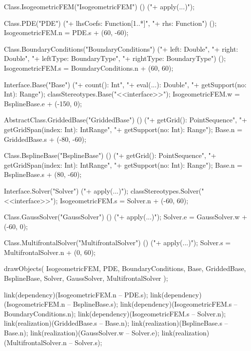  {
	Class.IsogeometricFEM("IsogeometricFEM")
		() ("+ apply(...)");

	Class.PDE("PDE")
		("+ lhsCoefs: Function[1..*]", "+ rhs: Function") ();
	IsogeometricFEM.n = PDE.s + (60, -60);

	Class.BoundaryConditions("BoundaryConditions")
		("+ left: Double", "+ right: Double",
		 "+ leftType: BoundaryType", "+ rightType: BoundaryType") ();
	IsogeometricFEM.s = BoundaryConditions.n + (60, 60);

	Interface.Base("Base")
		("+ count(): Int",
		 "+ eval(...): Double",
		 "+ getSupport(no: Int): Range");
	classStereotypes.Base("<<interface>>");
	IsogeometricFEM.w = BsplineBase.e + (-150, 0);

	AbstractClass.GriddedBase("GriddedBase") ()
		("+ getGrid(): PointSequence",
		 "+ getGridSpan(index: Int): IntRange",
		 "+ getSupport(no: Int): Range");
	Base.n = GriddedBase.s + (-80, -60);

	Class.BsplineBase("BsplineBase") ()
		("+ getGrid(): PointSequence",
		 "+ getGridSpan(index: Int): IntRange",
		 "+ getSupport(no: Int): Range");
	Base.n = BsplineBase.s + (80, -60);

	Interface.Solver("Solver")
		("+ apply(...)");
	classStereotypes.Solver("<<interface>>");
	IsogeometricFEM.s = Solver.n + (-60, 60);

	Class.GaussSolver("GaussSolver")
		() ("+ apply(...)");
	Solver.e = GaussSolver.w + (-60, 0);

	Class.MultifrontalSolver("MultifrontalSolver")
		() ("+ apply(...)");
	Solver.s = MultifrontalSolver.n + (0, 60);


	drawObjects(
		IsogeometricFEM,
		PDE, BoundaryConditions,
		Base, GriddedBase, BsplineBase,
		Solver, GaussSolver, MultifrontalSolver
	);

	link(dependency)(IsogeometricFEM.n -- PDE.s);
	link(dependency)(IsogeometricFEM.n -- BsplineBase.s);
	link(dependency)(IsogeometricFEM.s -- BoundaryConditions.n);
	link(dependency)(IsogeometricFEM.s -- Solver.n);
	link(realization)(GriddedBase.s -- Base.n);
	link(realization)(BsplineBase.s -- Base.n);
	link(realization)(GaussSolver.w -- Solver.e);
	link(realization)(MultifrontalSolver.n -- Solver.s);
}

